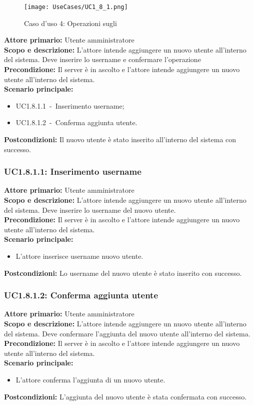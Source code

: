\documentclass{scalatekids-article}
\begin{document}
\begin{figure}[H]
  \begin{center}
    \texttt{[image: UseCases/UC1\_8\_1.png]}
    \caption*{Caso d'uso 4: Operazioni sugli }
  \end{center}
\end{figure}
\textbf{Attore primario:} Utente amministratore\\
\textbf{Scopo e descrizione:} L'attore intende aggiungere un nuovo utente all'interno del sistema. Deve inserire lo username e confermare l'operazione\\
\textbf{Precondizione:} Il server è in ascolto e l'attore intende aggiungere un nuovo utente all'interno del sistema.\\
\textbf{Scenario principale:}
\begin{itemize}
\item UC1.8.1.1\ -\ Inserimento username;
\item UC1.8.1.2\ -\ Conferma aggiunta utente.
\end{itemize}
\textbf{Postcondizioni:} Il nuovo utente è stato inserito all'interno del sistema con successo.

\subsubsection{UC1.8.1.1: Inserimento username}

\textbf{Attore primario:} Utente amministratore\\
\textbf{Scopo e descrizione:} L'attore intende aggiungere un nuovo utente all'interno del sistema. Deve inserire lo username del nuovo utente.\\
\textbf{Precondizione:} Il server è in ascolto e l'attore intende aggiungere un nuovo utente all'interno del sistema.\\
\textbf{Scenario principale:}
\begin{itemize}
\item L'attore inserisce username nuovo utente.
\end{itemize}
\textbf{Postcondizioni:} Lo username del nuovo utente è stato inserito con successo.

\subsubsection{UC1.8.1.2: Conferma aggiunta utente}

\textbf{Attore primario:} Utente amministratore\\
\textbf{Scopo e descrizione:} L'attore intende aggiungere un nuovo utente all'interno del sistema. Deve confermare l'aggiunta del nuovo utente all'interno del sistema.\\
\textbf{Precondizione:} Il server è in ascolto e l'attore intende aggiungere un nuovo utente all'interno del sistema.\\
\textbf{Scenario principale:}
\begin{itemize}
\item L'attore conferma l'aggiunta di un nuovo utente.
\end{itemize}
\textbf{Postcondizioni:} L'aggiunta del nuovo utente è stata confermata con successo.
\end{document}
